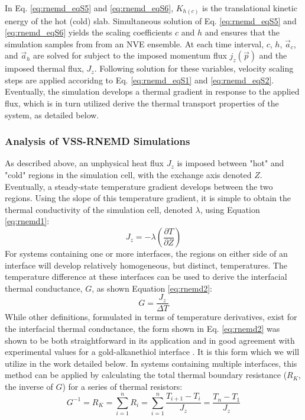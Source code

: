 In Eq. \ref{eq:rnemd_eqS5} and \ref{eq:rnemd_eqS6}, $K_{h\left(c\right)}$ is the translational kinetic energy of the hot (cold) slab.  Simultaneous solution of Eq. \ref{eq:rnemd_eqS5} and \ref{eq:rnemd_eqS6} yields the scaling coefficients $c$ and $h$ and ensures that the simulation samples from from an NVE ensemble.  At each time interval, $c$, $h$, $\vec{a}_c$, and $\vec{a}_h$ are solved for subject to the imposed momentum flux $j_z\left(\vec{p}\right)$ and the imposed thermal flux, $J_z$.  Following solution for these variables, velocity scaling steps are applied accoridng to Eq. \ref{eq:rnemd_eqS1} and \ref{eq:rnemd_eqS2}.  Eventually, the simulation develops a thermal gradient in response to the applied flux, which is in turn utilized derive the thermal transport properties of the system, as detailed below. 

\subsubsection{Analysis of VSS-RNEMD Simulations}

As described above, an unphysical heat flux $J_z$ is imposed between "hot" and "cold" regions in the simulation cell, with the exchange axis denoted $Z$.  Eventually, a steady-state temperature gradient develops between the two regions. Using the slope of this temperature gradient, it is simple to obtain the thermal conductivity of the simulation cell, denoted $\lambda$, using Equation \ref{eq:rnemd1}:
\begin{equation} \label{eq:rnemd1}
J_z = -\lambda\left(\frac{\partial T}{\partial Z}\right)
\end{equation}
For systems containing one or more interfaces, the regions on either side of an interface will develop relatively homogeneous, but distinct, temperatures. The temperature difference at these interfaces can be used to derive the interfacial thermal conductance, $G$, as shown Equation \ref{eq:rnemd2}:
\begin{equation} \label{eq:rnemd2}
G = \frac{J_z}{\Delta T}
\end{equation}
While other definitions, formulated in terms of temperature derivatives, exist for the interfacial thermal conductance, the form shown in Eq. \ref{eq:rnemd2} was shown to be both straightforward in its application and in good agreement with experimental values for a gold-alkanethiol interface \cite{doi:10.1021/jp2073478}.  It is this form which we will utilize in the work detailed below. In systems containing multiple interfaces, this method can be applied by calculating the total thermal boundary resistance ($R_K$, the inverse of $G$) for a series of thermal resistors:
\begin{equation} \label{eq:rnemd3}
G^{-1} = R_K = \sum_{i = 1}^n R_i = \sum_{i = 1}^n \frac{T_{i+1} - T_i}{J_z} = \frac{T_n - T_1}{J_z}
\end{equation}

